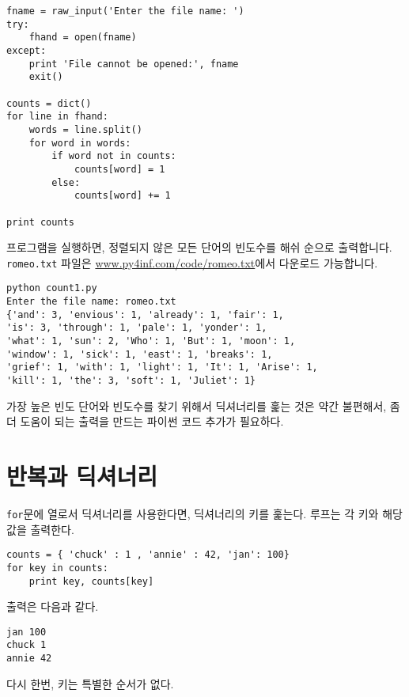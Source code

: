 \beforeverb
\begin{verbatim}
fname = raw_input('Enter the file name: ')
try:
    fhand = open(fname)
except:
    print 'File cannot be opened:', fname
    exit()

counts = dict()
for line in fhand:
    words = line.split()
    for word in words:
        if word not in counts:
            counts[word] = 1
        else:
            counts[word] += 1

print counts
\end{verbatim}
\afterverb
%

프로그램을 실행하면, 정렬되지 않은 모든 단어의 빈도수를 해쉬 순으로 출력합니다.
{\tt romeo.txt} 파일은 \url{www.py4inf.com/code/romeo.txt}에서 다운로드 가능합니다.

\beforeverb
\begin{verbatim}
python count1.py 
Enter the file name: romeo.txt
{'and': 3, 'envious': 1, 'already': 1, 'fair': 1, 
'is': 3, 'through': 1, 'pale': 1, 'yonder': 1, 
'what': 1, 'sun': 2, 'Who': 1, 'But': 1, 'moon': 1, 
'window': 1, 'sick': 1, 'east': 1, 'breaks': 1, 
'grief': 1, 'with': 1, 'light': 1, 'It': 1, 'Arise': 1, 
'kill': 1, 'the': 3, 'soft': 1, 'Juliet': 1}
\end{verbatim}
\afterverb
%

가장 높은 빈도 단어와 빈도수를 찾기 위해서 딕셔너리를 훑는 것은 약간 불편해서, 좀더 도움이 되는 출력을 만드는 파이썬 코드 추가가 필요하다.

\section{반복과 딕셔너리}


{\tt for}문에 열로서 딕셔너리를 사용한다면, 딕셔너리의 키를 훑는다. 루프는 각 키와 해당 값을 출력한다.

\beforeverb
\begin{verbatim}
counts = { 'chuck' : 1 , 'annie' : 42, 'jan': 100}
for key in counts:
    print key, counts[key]
\end{verbatim}
\afterverb
%

출력은 다음과 같다.

\beforeverb
\begin{verbatim}
jan 100
chuck 1
annie 42
\end{verbatim}
\afterverb
%

다시 한번, 키는 특별한 순서가 없다.

